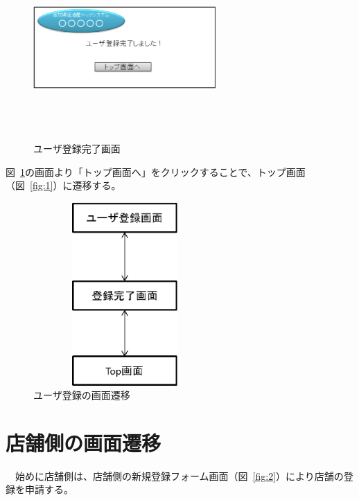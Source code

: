 \begin {figure}[!htbp]
    \begin{center}
    \includegraphics [height=7cm, width=7cm]{23.eps}
    \caption {ユーザ登録完了画面}
    \label {fig:23}
    \end{center}
\end {figure}



図~\ref{fig:23}の画面より「トップ画面へ」をクリックすることで、トップ画面（図~\ref{fig:1}）に遷移する。



\begin {figure}[!htbp]
    \begin{center}
    \includegraphics [height=7cm, width=7cm]{24.eps}
    \caption {ユーザ登録の画面遷移}
    \label {fig:24}
    \end{center}
\end {figure}
\clearpage
\section{店舗側の画面遷移}


　始めに店舗側は、店舗側の新規登録フォーム画面（図~\ref{fig:2}）により店舗の登録を申請する。



